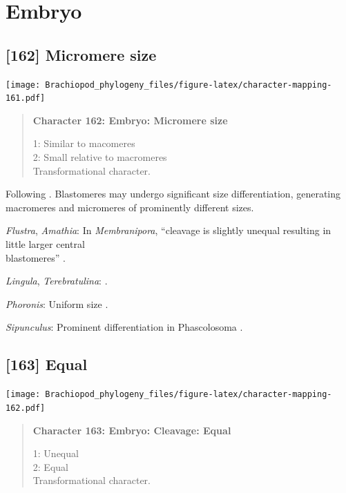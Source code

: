 \documentclass[openany]{book}
\begin{document}
\section{Embryo}\label{embryo}

\subsection*{{[}162{]} Micromere size}\label{micromere-size}

\texttt{[image: Brachiopod\_phylogeny\_files/figure-latex/character-mapping-161.pdf]}

\begin{quote}
\textbf{Character 162: Embryo: Micromere size}

1: Similar to macomeres\\
2: Small relative to macromeres\\
Transformational character.
\end{quote}

Following \citet{Hejnol2010}. Blastomeres may undergo significant size
differentiation, generating macromeres and micromeres of prominently
different sizes.

\hypertarget{Amathia-coding-162}{}
\emph{Flustra}, \emph{Amathia}: In \emph{Membranipora}, ``cleavage is
slightly unequal resulting in little larger central\\
blastomeres'' \citep{Gruhl2010M}.

\hypertarget{Lingula-coding-162}{}
\emph{Lingula}, \emph{Terebratulina}: \citet{Williams1997Introduction}.

\hypertarget{Phoronis-coding-162}{}
\emph{Phoronis}: Uniform size \citep{Pennerstorfer2012}.

\hypertarget{Sipunculus-coding-162}{}
\emph{Sipunculus}: Prominent differentiation in Phascolosoma
\citep{Adrianov2011}.

\subsection*{{[}163{]} Equal}\label{equal}

\texttt{[image: Brachiopod\_phylogeny\_files/figure-latex/character-mapping-162.pdf]}

\begin{quote}
\textbf{Character 163: Embryo: Cleavage: Equal}

1: Unequal\\
2: Equal\\
Transformational character.
\end{quote}
\end{document}

